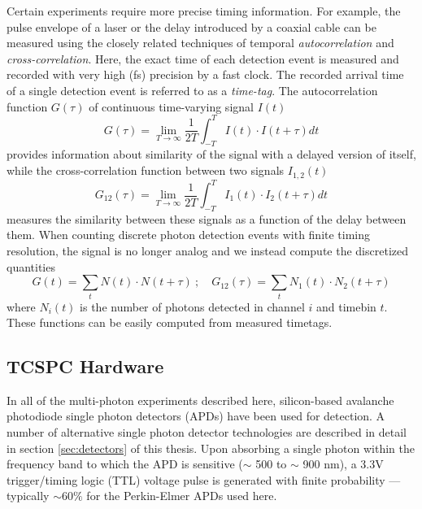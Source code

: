 Certain experiments require more precise timing information. For example, the pulse envelope of a laser or the delay introduced by a coaxial cable can be measured using the closely related techniques of temporal \emph{autocorrelation} and \emph{cross-correlation}. Here, the exact time of each detection event is measured and recorded with very high (fs) precision by a fast clock. The recorded arrival time of a single detection event is referred to as a \emph{time-tag}.
The autocorrelation function $G(\tau)$ of continuous time-varying signal $I(t)$  
\begin{equation}
    G(\tau) = \lim_{T\to \infty} \frac{1}{2T} \int_{-T}^{T} I(t) \cdot I(t+\tau) dt
\end{equation}
provides information about similarity of the signal with a delayed version of itself, while the cross-correlation function between two signals $I_{1,2}(t)$ 
\begin{equation}
    G_{12}(\tau) = \lim_{T\to \infty} \frac{1}{2T} \int_{-T}^{T} I_1(t) \cdot I_2(t+\tau) dt
    \label{eqn:cross-correlation}
\end{equation}
measures the similarity between these signals as a function of the delay between them. When counting discrete photon detection events with finite timing resolution, the signal is no longer analog and we instead compute the discretized quantities
\begin{equation}
    G(t) = \sum_t N(t) \cdot N(t+\tau)~;\quad G_{12}(\tau) = \sum_t N_1(t) \cdot N_2(t+\tau)
    \label{eqn:cross-correlation-discrete}
\end{equation}
where $N_i(t)$ is the number of photons detected in channel $i$ and timebin $t$. These functions can be easily computed from measured timetags.

\subsection{TCSPC Hardware} 
In all of the multi-photon experiments described here, silicon-based avalanche photodiode single photon detectors (APDs) have been used for detection. A number of alternative single photon detector technologies are described in detail in section \ref{sec:detectors} of this thesis. Upon absorbing a single photon within the frequency band to which the APD is sensitive ($\sim$ 500 to $\sim$ 900 nm), a 3.3V trigger/timing logic (TTL) voltage pulse is generated with finite probability --- typically $\sim60\%$ for the Perkin-Elmer APDs used here. 

